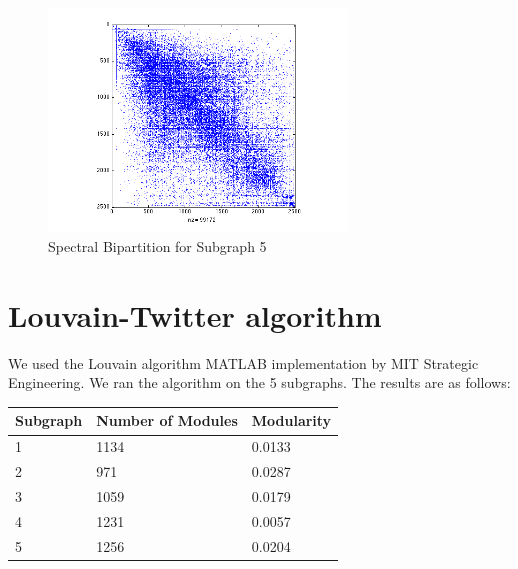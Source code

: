 \documentclass[11pt]{article}
\begin{document}
		 \begin{figure}
		 		\begin{center}
		  		\includegraphics[width=300px]{spectral_partition_a5.png}
		  	\end{center}
		  	\caption{Spectral Bipartition for Subgraph 5}
		  	\label{fig:sb5}
		 \end{figure}
		  

\section{Louvain-Twitter algorithm}
We used the Louvain algorithm MATLAB implementation by MIT Strategic Engineering. We ran the algorithm on the 5 subgraphs. The results are as follows:

\begin{table}[!htbp]
		\begin{tabular}{lll}
		Subgraph & Number of Modules & Modularity \\
	  \hline
		1 & 1134 & 0.0133 \\
		2 & 971 & 0.0287 \\
		3 & 1059 & 0.0179 \\
		4 & 1231 & 0.0057 \\
		5 & 1256 & 0.0204 \\
		\end{tabular}
\end{table}

     
\end{document}
